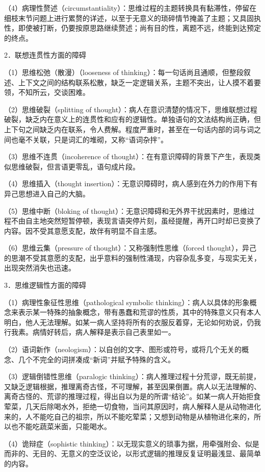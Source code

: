 （4）病理性赘述（circumstantiality）：思维过程的主题转换具有黏滞性，停留在细枝末节问题上进行累赘的详述，以至于无意义的琐碎情节掩盖了主题；又具固执性，即使被打断，仍要按原思路继续赘述；尚有目的性，离题不远，终能到达预定的终点。

2．联想连贯性方面的障碍

（1）思维松弛（散漫）（looseness of
thinking）：每一句话尚且通顺，但整段叙述、上下文之间的结构联系松散，缺乏一定逻辑关系，主题不突出，让人摸不着要领，不知所云，交谈困难。

（2）思维破裂（splitting of
thought）：病人在意识清楚的情况下，思维联想过程破裂，缺乏内在意义上的连贯性和应有的逻辑性。单独语句的文法结构尚正确，但上下句之间缺乏内在联系，令人费解。程度严重时，甚至在一句话内部的词与词之间也毫不关联，只是词汇的堆砌，又称“语词杂拌”。

（3）思维不连贯（incoherence of
thought）：在有意识障碍的背景下产生，表现类似思维破裂，但言语更零乱，语句成片段。

（4）思维插入（thought
insertion）：无意识障碍时，病人感到在外力的作用下有异己思想进入自己的大脑。

（5）思维中断（bloking of
thought）：无意识障碍和无外界干扰因素时，思维过程不由自主地突然短暂停顿，表现言语突停片刻，虽经提醒，再开口时却已变换了内容。因不受其意愿支配，故伴有明显不自主感。

（6）思维云集（pressure of thought）：又称强制性思维（forced
thought），异己的思潮不受其意愿的支配，出乎意料的强制性涌现，内容杂乱多变，与现实无关，出现突然消失也迅速。

3．思维逻辑性方面的障碍

（1）病理性象征性思维（pathological symbolic
thinking）：病人以具体的形象概念来表示某一特殊的抽象概念，带有愚蠢和荒谬的性质，其中的特殊意义只有本人明白，他人无法理解。如某一病人坚持将所有的衣服反着穿，无论如何劝说，仍我行我素。病情好转后，病人解释是表示自己表里如一。

（2）语词新作（neologism）：以自创的文字、图形或符号，或将几个无关的概念、几个不完全的词拼凑成“新词”并赋予特殊的含义。

（3）逻辑倒错性思维（paralogic
thinking）：病人推理过程十分荒谬，既无前提，又缺乏逻辑根据，推理离奇古怪，不可理解，甚至因果倒置。病人以无法理解的、离奇古怪的、荒谬的推理过程，得出自以为是的所谓“结论”。如某一病人开始拒食荤菜，几天后除喝水外，拒绝一切食物，当问其原因时，病人解释人是从动物进化来的，人不能吃自己的祖宗，所以不能吃荤菜；又想到动物是从植物进化来的，所以也不能吃蔬菜米面，只能喝水。

（4）诡辩症（sophistic
thinking）：以无现实意义的琐事为据，用牵强附会、似是而非的、无目的、无意义的空泛议论，以形式逻辑的推理反复证明最浅显、最简单的内容。

